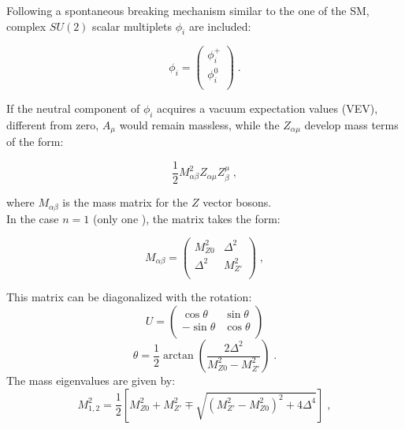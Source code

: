 \noindent Following a spontaneous breaking mechanism similar to the one of 
the SM, complex $SU(2)$ scalar multiplets $\phi_{i}$ are included:

\begin{equation}
 \phi_{i} = 
\left(
 \begin{matrix}
  \phi^{+}_{i} \\
  \phi^{0}_{i} \\
 \end{matrix}
\right) \; .
 \end{equation}

 \noindent If the neutral component of $\phi_{i}$ acquires a vacuum expectation 
 values (VEV), different from zero, $A_{\mu}$ would remain massless,
 while the $Z_{\alpha \mu}$ develop mass terms of the form:
 
 \begin{equation*}
  \frac{1}{2}M_{\alpha \beta}^{2} Z_{\alpha \mu} Z_{\beta}^{\mu} \; ,
 \end{equation*}

 \noindent where $M_{\alpha \beta}$ is the mass matrix for the $Z$ vector
 bosons. \\
 
 \noindent In the case $n = 1$ (only one \Zprime), the matrix takes the form:
 
\begin{equation}
 M_{\alpha \beta} = 
\left(
 \begin{matrix}
  M_{Z 0}^{2}  & \Delta^{2}     \\
  \Delta^{2}   & M_{Z\prime}^{2} \\
 \end{matrix}
\right) \; , 
 \end{equation}
 
\noindent This matrix can be diagonalized with the rotation:
 \begin{equation}
 U = 
\left(
 \begin{matrix}
   \cos \theta  & \sin \theta \\
   -\sin \theta & \cos \theta \\
 \end{matrix}
\right) 
 \end{equation}
\begin{equation}
 \theta = \frac{1}{2} \arctan \left( \frac{2 \Delta^{2}}{M_{Z 0}^{2} - M_{Z\prime}^{2}} \right) \; .
\end{equation}
\noindent The mass eigenvalues are given by:
\begin{equation}
 M_{1,2}^{2} = \frac{1}{2} \left[ M_{Z 0}^{2} + M_{Z\prime}^{2} \mp \sqrt{(M_{Z\prime}^{2} - M_{Z 0}^{2})^{2}+4 \Delta^{4}} \right]  \; ,
\end{equation}

